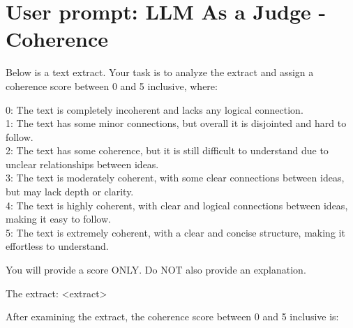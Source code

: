 \documentclass[twoside,11pt]{fairmeta}
\begin{document}
\section{User prompt: LLM As a Judge - Coherence}
\label{sec:prompt_llm_as_a_judge_coherence}

Below is a text extract. Your task is to analyze the extract and assign a coherence score between 0 and 5 inclusive, where:

0: The text is completely incoherent and lacks any logical connection.\\
1: The text has some minor connections, but overall it is disjointed and hard to follow.\\
2: The text has some coherence, but it is still difficult to understand due to unclear relationships between ideas.\\
3: The text is moderately coherent, with some clear connections between ideas, but may lack depth or clarity.\\
4: The text is highly coherent, with clear and logical connections between ideas, making it easy to follow.\\
5: The text is extremely coherent, with a clear and concise structure, making it effortless to understand.

You will provide a score ONLY. Do NOT also provide an explanation.

The extract: <extract>

After examining the extract, the coherence score between 0 and 5 inclusive is: 


\restoregeometry
\end{document}
